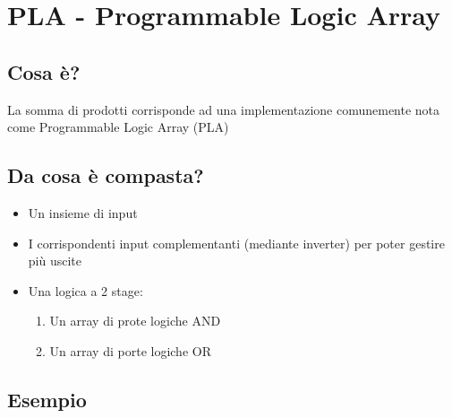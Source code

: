 \section{PLA - Programmable Logic Array}
\subsection{Cosa è?}
La somma di prodotti corrisponde ad una implementazione comunemente nota come Programmable Logic Array (PLA)

\subsection{Da cosa è compasta?}
\begin{itemize}
    \item Un insieme di input
    \item I corrispondenti input complementanti (mediante inverter) per poter gestire più uscite
    \item Una logica a 2 stage:
    \begin{enumerate}
        \item Un array di prote logiche AND
        \item Un array di porte logiche OR
    \end{enumerate}
\end{itemize}

\subsection{Esempio}

